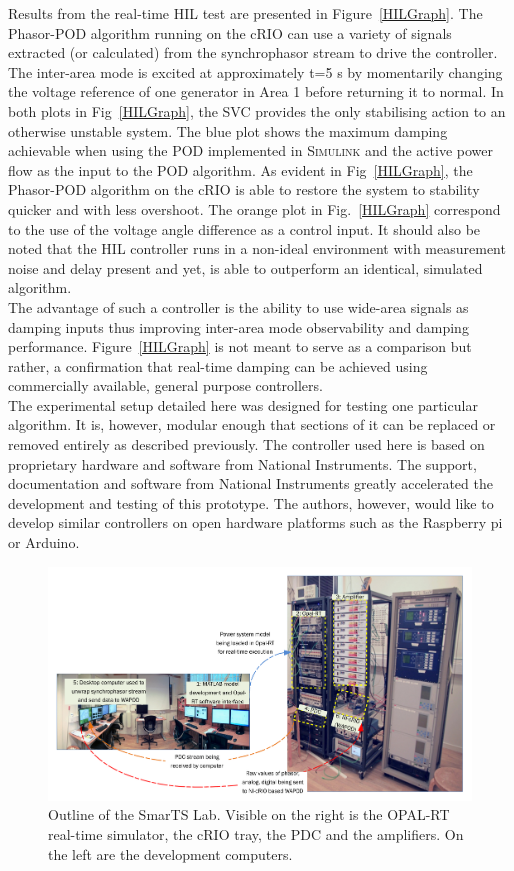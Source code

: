 \documentclass[conference]{IEEEtran}
\begin{document}
Results from the real-time HIL test are presented in Figure~\ref{HILGraph}. The Phasor-POD algorithm running on the cRIO can use a variety of signals extracted (or calculated) from the synchrophasor stream to drive the controller. The inter-area mode is excited at approximately t=5 s by momentarily changing the voltage reference of one generator in Area 1 before returning it to normal. In both plots in Fig~\ref{HILGraph}, the SVC provides the only stabilising action to an otherwise unstable \cite{KundurTwoArea} system. The blue plot shows the maximum damping achievable when using the POD implemented in \textsc{Simulink} and the active power flow as the input to the POD algorithm. As evident in Fig~\ref{HILGraph}, the Phasor-POD algorithm on the cRIO is able to restore the system to stability quicker and with less overshoot. The orange plot in Fig.~\ref{HILGraph} correspond to the use of the voltage angle difference as a control input. It should also be noted that the HIL controller runs in a non-ideal environment with measurement noise and delay present and yet, is able to outperform an identical, simulated algorithm.\\

The advantage of such a controller is the ability to use wide-area signals as damping inputs thus improving inter-area mode observability and damping performance. Figure~\ref{HILGraph} is not meant to serve as a comparison but rather, a confirmation that real-time damping can be achieved using commercially available, general purpose controllers.\\

The experimental setup detailed here was designed for testing one particular algorithm. It is, however, modular enough that sections of it can be replaced or removed entirely as described previously. The controller used here is based on proprietary hardware and software from National Instruments. The support, documentation and software from National Instruments greatly accelerated the development and testing of this prototype. The authors, however, would like to develop similar controllers on open hardware platforms such as the Raspberry pi or Arduino.
\begin{figure}[!hb]
	\centering
	\includegraphics[width=7in]{CIGRE_Report_Drawing.pdf}
	\caption{Outline of the SmarTS Lab. Visible on the right is the OPAL-RT real-time simulator, the cRIO tray, the PDC and the amplifiers. On the left are the development computers.}
	\label{fig:Lab_Numbered}
\end{figure}
\end{document}
